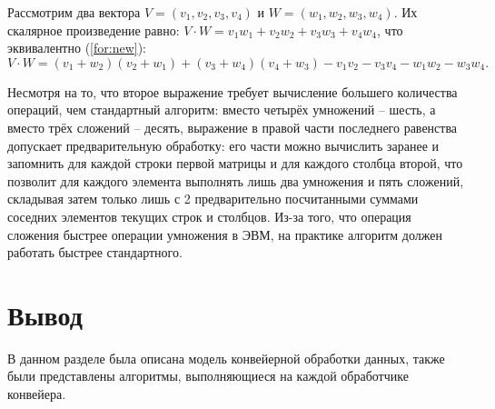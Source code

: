 Рассмотрим два вектора $V = (v_1, v_2, v_3, v_4)$ и $W = (w_1, w_2, w_3, w_4)$.
Их скалярное произведение равно: $V \cdot W = v_1w_1 + v_2w_2 + v_3w_3 + v_4w_4$, что эквивалентно (\ref{for:new}):
\begin{equation}
	\label{for:new}
		V \cdot W = (v_1 + w_2)(v_2 + w_1) + (v_3 + w_4)(v_4 + w_3) - v_1v_2 - v_3v_4 - w_1w_2 - w_3w_4.
\end{equation}

Несмотря на то, что второе выражение требует вычисление большего количества операций, чем стандартный алгоритм: вместо четырёх умножений -- шесть, а вместо трёх сложений -- десять, выражение в правой части последнего равенства допускает предварительную обработку: его части можно вычислить заранее и запомнить для каждой строки первой матрицы и для каждого столбца второй, что позволит для каждого элемента выполнять лишь два умножения и пять сложений, складывая затем только лишь с 2 предварительно посчитанными суммами соседних элементов текущих строк и столбцов.
Из-за того, что операция сложения быстрее операции умножения в ЭВМ, на практике алгоритм должен работать быстрее стандартного.\cite{winograd}

\section*{Вывод}

В данном разделе была описана модель конвейерной обработки данных, также были
представлены алгоритмы, выполняющиеся на каждой обработчике конвейера.
